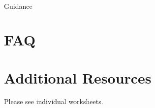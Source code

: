 \documentclass{../../../fal_assignment}
\begin{document}
Guidance

\section*{FAQ}

%    		
%    		
%    		

\section*{Additional Resources}

Please see individual worksheets.

\end{document}
